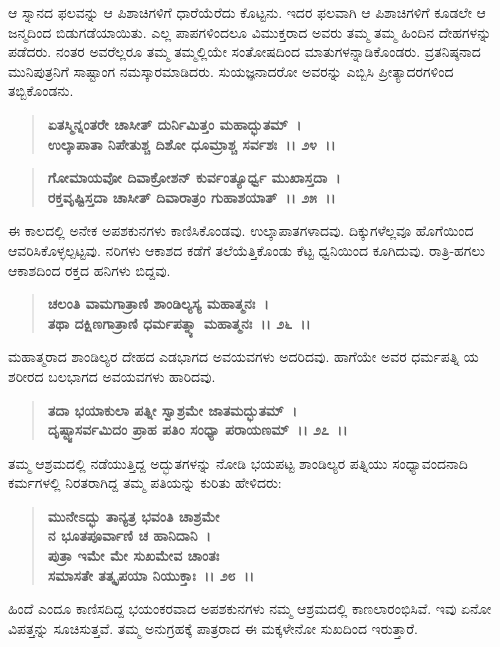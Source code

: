 ಆ ಸ್ನಾನದ ಫಲವನ್ನು ಆ ಪಿಶಾಚಿಗಳಿಗೆ ಧಾರೆಯೆರೆದು ಕೊಟ್ಟನು. ಇದರ ಫಲವಾಗಿ ಆ ಪಿಶಾಚಿಗಳಿಗೆ ಕೂಡಲೇ ಆ ಜನ್ಮದಿಂದ ಬಿಡುಗಡೆಯಾಯಿತು. ಎಲ್ಲ ಪಾಪಗಳಿಂದಲೂ ವಿಮುಕ್ತರಾದ ಅವರು ತಮ್ಮ ತಮ್ಮ ಹಿಂದಿನ ದೇಹಗಳನ್ನು ಪಡೆದರು. ನಂತರ ಅವರೆಲ್ಲರೂ ತಮ್ಮ ತಮ್ಮಲ್ಲಿಯೇ ಸಂತೋಷದಿಂದ ಮಾತುಗಳನ್ನಾಡಿಕೊಂಡರು. ವ್ರತನಿಷ್ಠನಾದ ಮುನಿಪುತ್ರನಿಗೆ ಸಾಷ್ಟಾಂಗ ನಮಸ್ಕಾರಮಾಡಿದರು. ಸುಯಜ್ಞನಾದರೋ ಅವರನ್ನು ಎಬ್ಬಿಸಿ ಪ್ರೀತ್ಯಾದರಗಳಿಂದ ತಬ್ಬಿಕೊಂಡನು.

\begin{verse}
\textbf{ಏತಸ್ಮಿನ್ನಂತರೇ ಚಾಸೀತ್ ದುರ್ನಿಮಿತ್ತಂ ಮಹಾದ್ಭುತಮ್~।}\\\textbf{ಉಲ್ಕಾಪಾತಾ ನಿಪೇತುಶ್ಚ ದಿಶೋ ಧೂಮ್ರಾಶ್ಚ ಸರ್ವಶಃ~।। ೨೪~।। }
\end{verse}

\begin{verse}
\textbf{ಗೋಮಾಯವೋ ದಿವಾಕ್ರೋಶನ್ ಕುರ್ವಂತ್ಯೂರ್ಧ್ವ ಮುಖಾಸ್ತದಾ~।}\\\textbf{ರಕ್ತವೃಷ್ಟಿಸ್ತದಾ ಚಾಸೀತ್ ದಿವಾರಾತ್ರಂ ಗುಹಾಶಯಾತ್~।। ೨೫~।।}
\end{verse}

ಈ ಕಾಲದಲ್ಲಿ ಅನೇಕ ಅಪಶಕುನಗಳು ಕಾಣಿಸಿಕೊಂಡವು. ಉಲ್ಕಾಪಾತಗಳಾದವು. ದಿಕ್ಕುಗಳೆಲ್ಲವೂ ಹೊಗೆಯಿಂದ ಆವರಿಸಿಕೊಳ್ಳಲ್ಪಟ್ಟವು. ನರಿಗಳು ಆಕಾಶದ ಕಡೆಗೆ ತಲೆಯೆತ್ತಿಕೊಂಡು ಕೆಟ್ಟ ಧ್ವನಿಯಿಂದ ಕೂಗಿದುವು. ರಾತ್ರಿ-ಹಗಲು ಆಕಾಶದಿಂದ ರಕ್ತದ ಹನಿಗಳು ಬಿದ್ದವು.

\begin{verse}
\textbf{ಚಲಂತಿ ವಾಮಗಾತ್ರಾಣಿ ಶಾಂಡಿಲ್ಯಸ್ಯ ಮಹಾತ್ಮನಃ~।}\\\textbf{ತಥಾ ದಕ್ಷಿಣಗಾತ್ರಾಣಿ ಧರ್ಮಪತ್ನ್ಯಾ ಮಹಾತ್ಮನಃ~।। ೨೬~।।}
\end{verse}

ಮಹಾತ್ಮರಾದ ಶಾಂಡಿಲ್ಯರ ದೇಹದ ಎಡಭಾಗದ ಅವಯವಗಳು ಅದರಿದವು. ಹಾಗೆಯೇ ಅವರ ಧರ್ಮಪತ್ನಿ ಯ ಶರೀರದ ಬಲಭಾಗದ ಅವಯವಗಳು ಹಾರಿದವು.

\begin{verse}
\textbf{ತದಾ ಭಯಾಕುಲಾ ಪತ್ನೀ ಸ್ವಾಶ್ರಮೇ ಜಾತಮದ್ಭುತಮ್~।}\\\textbf{ದೃಷ್ಟ್ವಾಸರ್ವಮಿದಂ ಪ್ರಾಹ ಪತಿಂ ಸಂಧ್ಯಾ ಪರಾಯಣಮ್~।। ೨೭~।।}
\end{verse}

ತಮ್ಮ ಆಶ್ರಮದಲ್ಲಿ ನಡೆಯುತ್ತಿದ್ದ ಅದ್ಭುತಗಳನ್ನು ನೋಡಿ ಭಯಪಟ್ಟ ಶಾಂಡಿಲ್ಯರ ಪತ್ನಿಯು ಸಂಧ್ಯಾವಂದನಾದಿ ಕರ್ಮಗಳಲ್ಲಿ ನಿರತರಾಗಿದ್ದ ತಮ್ಮ ಪತಿಯನ್ನು ಕುರಿತು ಹೇಳಿದರು:

\begin{verse}
\textbf{ಮುನೇಽದ್ಭು ತಾನ್ಯತ್ರ ಭವಂತಿ ಚಾಶ್ರಮೇ}\\\textbf{ನ ಭೂತಪೂರ್ವಾಣಿ ಚ ಹಾನಿದಾನಿ~।}\\\textbf{ಪುತ್ರಾ ಇಮೇ ಮೇ ಸುಖಮೇವ ಚಾಂತಃ} \\\textbf{ಸಮಾಸತೇ ತತ್ಕೃಪಯಾ ನಿಯುಕ್ತಾಃ~।। ೨೮~।।}
\end{verse}

ಹಿಂದೆ ಎಂದೂ ಕಾಣಿಸದಿದ್ದ ಭಯಂಕರವಾದ ಅಪಶಕುನಗಳು ನಮ್ಮ ಆಶ್ರಮದಲ್ಲಿ ಕಾಣಲಾರಂಭಿಸಿವೆ. ಇವು ಏನೋ ವಿಪತ್ತನ್ನು ಸೂಚಿಸುತ್ತವೆ. ತಮ್ಮ ಅನುಗ್ರಹಕ್ಕೆ ಪಾತ್ರರಾದ ಈ ಮಕ್ಕಳೇನೋ ಸುಖದಿಂದ ಇರುತ್ತಾರೆ.

